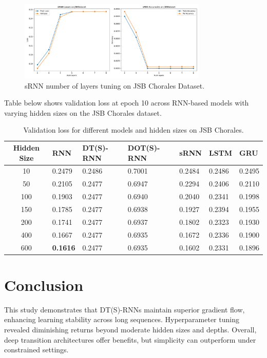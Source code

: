 \documentclass{article}
\begin{document}
\begin{figure}[H]
    \centering
    \includegraphics[width=0.8\textwidth]{JSB/sRNN_JSBDataset_num_layers_comparison.pdf}
    \caption{sRNN number of layers tuning on JSB Chorales Dataset.}
    \label{fig:srnn-num-layers-tuning-jsb}
\end{figure}

Table below shows validation loss at epoch 10 across RNN-based models with varying hidden sizes on the JSB Chorales dataset.
\begin{table}[H]
\centering
\small
\begin{tabularx}{\textwidth}{|c|X|X|X|X|X|X|}
\hline
\textbf{Hidden Size} & \textbf{RNN} & \textbf{DT(S)-RNN} & \textbf{DOT(S)-RNN} & \textbf{sRNN} & \textbf{LSTM} & \textbf{GRU} \\
\hline
10  & 0.2479 & 0.2486 & 0.7001 & 0.2484 & 0.2486 & 0.2495 \\
50  & 0.2105 & 0.2477 & 0.6947 & 0.2294 & 0.2406 & 0.2110 \\
100 & 0.1903 & 0.2477 & 0.6940 & 0.2040 & 0.2341 & 0.1998 \\
150 & 0.1785 & 0.2477 & 0.6938 & 0.1927 & 0.2394 & 0.1955 \\
200 & 0.1741 & 0.2477 & 0.6937 & 0.1802 & 0.2323 & 0.1930 \\
400 & 0.1667 & 0.2477 & 0.6935 & 0.1672 & 0.2336 & 0.1900 \\
600 & \textbf{0.1616} & 0.2477 & 0.6935 & 0.1602 & 0.2331 & 0.1896 \\
\hline
\end{tabularx}
\caption{Validation loss for different models and hidden sizes on JSB Chorales.}
\label{tab:jsb_val_loss_table}
\end{table}

\section{Conclusion}
This study demonstrates that DT(S)-RNNs maintain superior gradient flow, enhancing learning stability across long sequences. Hyperparameter tuning revealed diminishing returns beyond moderate hidden sizes and depths. Overall, deep transition architectures offer benefits, but simplicity can outperform under constrained settings.

\clearpage


\end{document}
